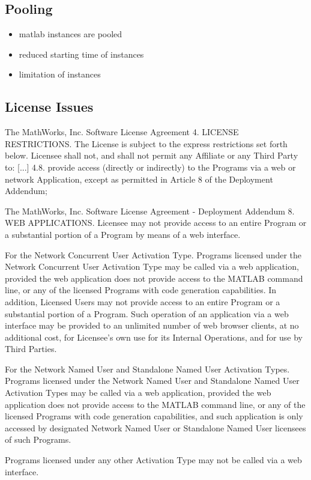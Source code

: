 	\subsection{Pooling}
	\begin{itemize}
		\item matlab instances are pooled
		\item reduced starting time of instances
		\item limitation of instances
	\end{itemize}
	\subsection{License Issues}
		\begin{signedquote}{The MathWorks, Inc. Software License Agreement}
			4. LICENSE RESTRICTIONS.  The License is subject to the express restrictions
			set forth below. Licensee shall not, and shall not permit any Affiliate or any
			Third Party to:
				[...]
			    4.8. provide access (directly or indirectly) to the Programs via a web or
			    network Application, except as permitted in Article 8 of the Deployment
			    Addendum;
		\end{signedquote}

		\begin{signedquote}{The MathWorks, Inc. Software License Agreement - Deployment Addendum}
			8. WEB APPLICATIONS.  Licensee may not provide access to an entire Program
			or a substantial portion of a Program by means of a web interface.

			For the Network Concurrent User Activation Type.  Programs licensed under the
			Network Concurrent User Activation Type may be called via a web application,
			provided the web application does not provide access to the MATLAB command
			line, or any of the licensed Programs with code generation capabilities.  In
			addition, Licensed Users may not provide access to an entire Program or a
			substantial portion of a Program.  Such operation of an application via a web
			interface may be provided to an unlimited number of web browser clients, at no
			additional cost, for Licensee's own use for its Internal Operations, and for
			use by Third Parties.

			For the Network Named User and Standalone Named User Activation Types.
			Programs licensed under the Network Named User and Standalone Named User
			Activation Types may be called via a web application, provided the web
			application does not provide access to the MATLAB command line, or any of the
			licensed Programs with code generation capabilities, and such application is
			only accessed by designated Network Named User or Standalone Named User
			licensees of such Programs.

			Programs licensed under any other Activation Type may not be called via a web
			interface.
		\end{signedquote}

